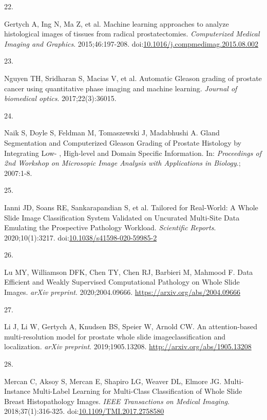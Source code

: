 \documentclass[
  12pt,
  a5,margin=2cmpaper,
]{article}
\newlength{\cslhangindent}
\newlength{\csllabelwidth}
\newlength{\cslentryspacingunit} %
\newenvironment{CSLReferences}[2] %
 {%
  \setlength{\parindent}{0pt}
  \ifodd #1
  \let\oldpar\par
  \def\par{\hangindent=\cslhangindent\oldpar}
  \fi
  \setlength{\parskip}{#2\cslentryspacingunit}
 }%
 {}
\newcommand{\CSLLeftMargin}[1]{\parbox[t]{\csllabelwidth}{#1}}
\newcommand{\CSLRightInline}[1]{\parbox[t]{\linewidth - \csllabelwidth}{#1}\break}
\begin{document}
\begin{CSLReferences}{0}{0}
\leavevmode{}%
\CSLLeftMargin{22. }%
\CSLRightInline{Gertych A, Ing N, Ma Z, et al. {Machine learning
approaches to analyze histological images of tissues from radical
prostatectomies}. \emph{Computerized Medical Imaging and Graphics}.
2015;46:197-208.
doi:\href{https://doi.org/10.1016/j.compmedimag.2015.08.002}{10.1016/j.compmedimag.2015.08.002}}

\leavevmode{}%
\CSLLeftMargin{23. }%
\CSLRightInline{Nguyen TH, Sridharan S, Macias V, et al. {Automatic
Gleason grading of prostate cancer using quantitative phase imaging and
machine learning}. \emph{Journal of biomedical optics}.
2017;22(3):36015.}

\leavevmode{}%
\CSLLeftMargin{24. }%
\CSLRightInline{Naik S, Doyle S, Feldman M, Tomaszewski J, Madabhushi A.
{Gland Segmentation and Computerized Gleason Grading of Prostate
Histology by Integrating Low- , High-level and Domain Specific
Information.} In: \emph{Proceedings of 2nd Workshop on Microsopic Image
Analysis with Applications in Biology}.; 2007:1-8.}

\leavevmode{}%
\CSLLeftMargin{25. }%
\CSLRightInline{Ianni JD, Soans RE, Sankarapandian S, et al. {Tailored
for Real-World: A Whole Slide Image Classification System Validated on
Uncurated Multi-Site Data Emulating the Prospective Pathology Workload}.
\emph{Scientific Reports}. 2020;10(1):3217.
doi:\href{https://doi.org/10.1038/s41598-020-59985-2}{10.1038/s41598-020-59985-2}}

\leavevmode{}%
\CSLLeftMargin{26. }%
\CSLRightInline{Lu MY, Williamson DFK, Chen TY, Chen RJ, Barbieri M,
Mahmood F. {Data Efficient and Weakly Supervised Computational Pathology
on Whole Slide Images}. \emph{arXiv preprint}. 2020;2004.09666.
\url{https://arxiv.org/abs/2004.09666}}

\leavevmode{}%
\CSLLeftMargin{27. }%
\CSLRightInline{Li J, Li W, Gertych A, Knudsen BS, Speier W, Arnold CW.
{An attention-based multi-resolution model for prostate whole slide
imageclassification and localization}. \emph{arXiv preprint}.
2019;1905.13208. \url{http://arxiv.org/abs/1905.13208}}

\leavevmode{}%
\CSLLeftMargin{28. }%
\CSLRightInline{Mercan C, Aksoy S, Mercan E, Shapiro LG, Weaver DL,
Elmore JG. {Multi-Instance Multi-Label Learning for Multi-Class
Classification of Whole Slide Breast Histopathology Images}. \emph{IEEE
Transactions on Medical Imaging}. 2018;37(1):316-325.
doi:\href{https://doi.org/10.1109/TMI.2017.2758580}{10.1109/TMI.2017.2758580}}


\end{CSLReferences}
\end{document}
